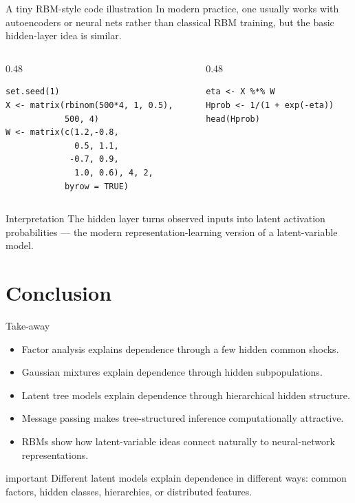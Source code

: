 \documentclass[dvipsnames,aspectratio=169,handout]{beamer}
\begin{document}
\begin{frame}[fragile]{A tiny RBM-style code illustration}
In modern practice, one usually works with autoencoders or neural nets rather than classical RBM training, but the basic hidden-layer idea is similar.

\begin{columns}[T,onlytextwidth]
\begin{column}{0.48\textwidth}
\begin{lstlisting}
set.seed(1)
X <- matrix(rbinom(500*4, 1, 0.5),
            500, 4)
W <- matrix(c(1.2,-0.8,
              0.5, 1.1,
             -0.7, 0.9,
              1.0, 0.6), 4, 2,
            byrow = TRUE)
\end{lstlisting}
\end{column}
\begin{column}{0.48\textwidth}
\begin{lstlisting}
eta <- X %*% W
Hprob <- 1/(1 + exp(-eta))
head(Hprob)
\end{lstlisting}
\end{column}
\end{columns}

\begin{alertblock}{Interpretation}
The hidden layer turns observed inputs into latent activation probabilities --- the modern representation-learning version of a latent-variable model.
\end{alertblock}
\end{frame}


\section{Conclusion}

\begin{frame}{Take-away}
\begin{itemize}
    \item Factor analysis explains dependence through a few hidden common shocks.
    \item Gaussian mixtures explain dependence through hidden subpopulations.
    \item Latent tree models explain dependence through hierarchical hidden structure.
    \item Message passing makes tree-structured inference computationally attractive.
    \item RBMs show how latent-variable ideas connect naturally to neural-network representations.
\end{itemize}

\vspace{2mm}
\begin{beamercolorbox}[wd=\textwidth,sep=8pt,center,rounded=true,shadow=true]{important}
Different latent models explain dependence in different ways:
common factors, hidden classes, hierarchies, or distributed features.
\end{beamercolorbox}
\end{frame}
\end{document}
